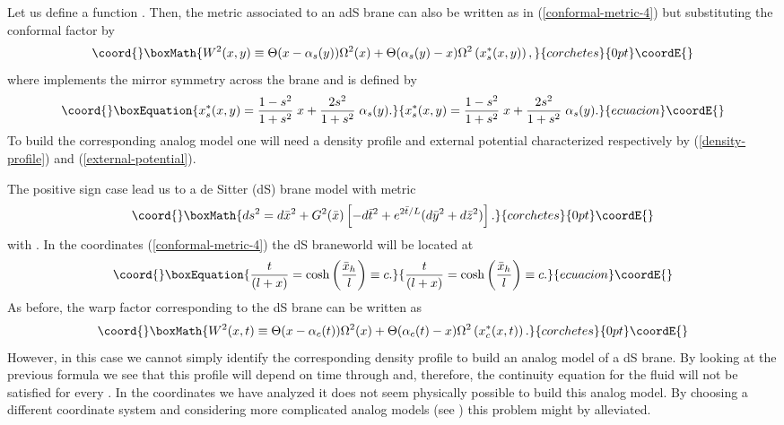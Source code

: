 \documentclass[a4paper,prl,showpacs,twocolumn]{revtex4}
\begin{document}
Let us define a function \coordHE{}.
Then, the metric associated to an adS brane
can also be written as in (\ref{conformal-metric-4}) but
substituting the conformal factor \coordHE{} by 
%
\[\coord{}\boxMath{
W^2(x,y)\equiv \Theta(x-\alpha_s(y)) \Omega^2(x)+
\Theta(\alpha_s(y)-x)\Omega^2
\left(x_s^*(x,y)\right),
}{corchetes}{0pt}\coordE{}\]
%
where \coordHE{} implements the mirror symmetry across the brane
and is defined by
%
\begin{equation}\coord{}\boxEquation{
x_s^*(x,y)={1-s^2 \over 1+s^2}\;x + {2s^2 \over 1+s^2}
\;\alpha_s(y).
}{
x_s^*(x,y)={1-s^2 \over 1+s^2}\;x + {2s^2 \over 1+s^2}
\;\alpha_s(y).
}{ecuacion}\coordE{}\end{equation}
%
To build the corresponding analog model one will
need a density profile and external potential characterized 
respectively by (\ref{density-profile}) and (\ref{external-potential}).


The positive sign case lead us to a de Sitter (dS)
brane model with metric \cite{dewolfe}
%
\[\coord{}\boxMath{
ds^2 = d {\bar x}^2 + G^2({\bar x})
\left[ -d{\bar t}^2+ e^{2{\bar t} /L}
(d{\bar y}^2+d{\bar z}^2) \right].
}{corchetes}{0pt}\coordE{}\]
%
with \coordHE{}.
In the coordinates (\ref{conformal-metric-4}) the dS
braneworld will be located at
%
\begin{equation}\coord{}\boxEquation{
{t \over (l+x)}=\cosh\left({{\bar x}_h \over l}\right)\equiv c.
}{
{t \over (l+x)}=\cosh\left({{\bar x}_h \over l}\right)\equiv c.
}{ecuacion}\coordE{}\end{equation}
%
As before, the warp factor corresponding to the dS brane can be written as
%
\[\coord{}\boxMath{
W^2(x,t)\equiv \Theta(x-\alpha_c(t)) \Omega^2(x)+
\Theta(\alpha_c(t)-x)\Omega^2
\left(x_c^*(x,t)\right).
}{corchetes}{0pt}\coordE{}\]
%
However, in this case we cannot simply identify the corresponding
density profile to build an analog model of a dS brane.
By looking at the previous formula we see that this profile will
depend on time through \coordHE{} and, therefore, the continuity
equation for the fluid will not be satisfied for every \coordHE{}.
In the coordinates we have analyzed it does not seem physically 
possible to build this analog model. 
By choosing a different coordinate system and considering more 
complicated analog models (see \cite{barcelo}) this problem might by 
alleviated. 
\end{document}
